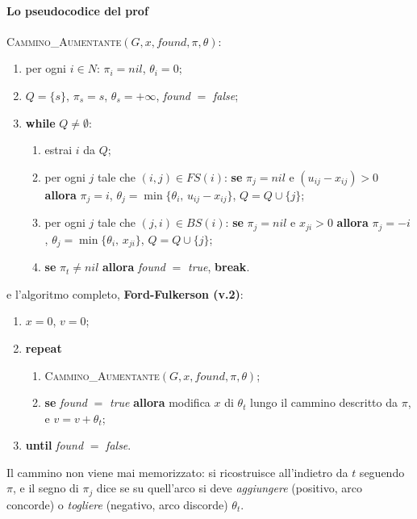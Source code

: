 \documentclass[12pt]{extarticle} %
\begin{document}
\paragraph{Lo pseudocodice del prof}
\textsc{Cammino\_Aumentante}$(G,x,\textit{found},\pi,\theta)$:
\begin{enumerate}
    \item per ogni $i \in N$: $\pi_i = \textit{nil}$, $\theta_i = 0$;
    \item $Q = \{s\}$, $\pi_s = s$, $\theta_s = +\infty$, \textit{found} $=$ \textit{false};
    \item \textbf{while} $Q \neq \emptyset$:
    \begin{enumerate}
        \item estrai $i$ da $Q$;
        \item per ogni $j$ tale che $(i,j) \in FS(i)$: \textbf{se} $\pi_j = \textit{nil}$ e $(u_{ij}-x_{ij}) > 0$ \textbf{allora} $\pi_j = i$, $\theta_j = \min\{\theta_i,\, u_{ij}-x_{ij}\}$, $Q = Q \cup \{j\}$;
        \item per ogni $j$ tale che $(j,i) \in BS(i)$: \textbf{se} $\pi_j = \textit{nil}$ e $x_{ji} > 0$ \textbf{allora} $\pi_j = -i$, $\theta_j = \min\{\theta_i,\, x_{ji}\}$, $Q = Q \cup \{j\}$;
        \item \textbf{se} $\pi_t \neq \textit{nil}$ \textbf{allora} \textit{found} $=$ \textit{true}, \textbf{break}.
    \end{enumerate}
\end{enumerate}
\noindent e l'algoritmo completo, \textbf{Ford-Fulkerson (v.2)}:
\begin{enumerate}
    \item $x = 0$, $v = 0$;
    \item \textbf{repeat}
    \begin{enumerate}
        \item \textsc{Cammino\_Aumentante}$(G,x,\textit{found},\pi,\theta)$;
        \item \textbf{se} \textit{found} $=$ \textit{true} \textbf{allora} modifica $x$ di $\theta_t$ lungo il cammino descritto da $\pi$, e $v = v + \theta_t$;
    \end{enumerate}
    \item \textbf{until} \textit{found} $=$ \textit{false}.
\end{enumerate}
\noindent Il cammino non viene mai memorizzato: si ricostruisce all'indietro da $t$ seguendo $\pi$, e il segno di $\pi_j$ dice se su quell'arco si deve \emph{aggiungere} (positivo, arco concorde) o \emph{togliere} (negativo, arco discorde) $\theta_t$.
\end{document}

